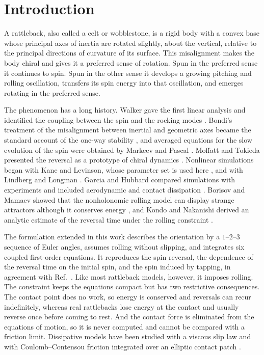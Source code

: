 \documentclass[aps,pre,twocolumn,superscriptaddress,amsmath,amssymb,floatfix,nofootinbib]{revtex4-2}
\begin{document}
\section{Introduction}

A rattleback, also called a celt or wobblestone, is a rigid body with a convex base whose
principal axes of inertia are rotated slightly, about the vertical, relative to the
principal directions of curvature of its surface. This misalignment makes the body chiral
and gives it a preferred sense of rotation. Spun in the preferred sense it continues to
spin. Spun in the other sense it develops a growing pitching and rolling oscillation,
transfers its spin energy into that oscillation, and emerges rotating in the preferred
sense.

The phenomenon has a long history. Walker gave the first linear analysis and identified
the coupling between the spin and the rocking modes \cite{Walker1896}. Bondi's treatment
of the misalignment between inertial and geometric axes became the standard account of
the one-way stability \cite{Bondi1986}, and averaged equations for the slow evolution of
the spin were obtained by Markeev \cite{Markeev1983} and Pascal \cite{Pascal1983}.
Moffatt and Tokieda presented the reversal as a prototype of chiral dynamics
\cite{Moffatt2008}. Nonlinear simulations began with Kane and Levinson, whose parameter
set is used here \cite{Kane1982}, and with Lindberg and Longman \cite{Lindberg1983}.
Garcia and Hubbard compared simulations with experiments and included aerodynamic and
contact dissipation \cite{Garcia1988}. Borisov and Mamaev showed that the nonholonomic
rolling model can display strange attractors although it conserves energy
\cite{Borisov2003}, and Kondo and Nakanishi derived an analytic estimate of the reversal
time under the rolling constraint \cite{Kondo2017}.

The formulation extended in this work \cite{Mukherjee} describes the orientation by a
$1$--$2$--$3$ sequence of Euler angles, assumes rolling without slipping, and integrates
six coupled first-order equations. It reproduces the spin reversal, the dependence of the
reversal time on the initial spin, and the spin induced by tapping, in agreement with
Ref.~\cite{Kane1982}. Like most rattleback models, however, it imposes rolling. The
constraint keeps the equations compact but has two restrictive consequences. The contact
point does no work, so energy is conserved and reversals can recur indefinitely, whereas
real rattlebacks lose energy at the contact and usually reverse once before coming to
rest. And the contact force is eliminated from the equations of motion, so it is never
computed and cannot be compared with a friction limit. Dissipative models have been
studied with a viscous slip law \cite{Takano2014} and with Coulomb--Contensou friction
integrated over an elliptic contact patch \cite{Kudra2015}.
\end{document}
